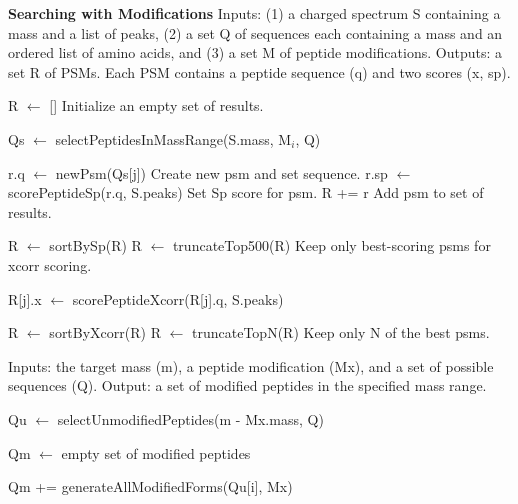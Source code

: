 \documentclass[12pt]{article}
\begin{document}
\begin{algorithm}
\caption{{\bf Searching with Modifications} Inputs: (1) a charged
  spectrum S containing a mass and a list of peaks, (2) a set Q of
  sequences each containing a mass and an ordered list of amino acids,
  and (3) a set M of peptide modifications. Outputs: a set R of PSMs.
  Each PSM contains a peptide sequence (q) and two scores (x, sp).} 

\begin{algorithmic}[1]

\State R $\gets$ []
\Comment Initialize an empty set of results.

   \State Qs $\gets$ selectPeptidesInMassRange(S.mass, M$_i$, Q)
   
     \State r.q $\gets$ newPsm(Qs[j])
     \Comment Create new psm and set sequence.
     \State r.sp $\gets$ scorePeptideSp(r.q, S.peaks)
     \Comment Set Sp score for psm.
     \State R += r
     \Comment Add psm to set of results.
   \EndFor

   \State R $\gets$ sortBySp(R)
   \State R $\gets$ truncateTop500(R)
   \Comment Keep only best-scoring psms for xcorr scoring.

     \State R[j].x $\gets$ scorePeptideXcorr(R[j].q, S.peaks)
   \EndFor

   \State R $\gets$ sortByXcorr(R)
   \State R $\gets$ truncateTopN(R)
   \Comment Keep only N of the best psms.

\EndFor

\State {}
\EndProcedure
\end{algorithmic}
\end{algorithm}

\begin{algorithm}
\caption{ Inputs: the target mass (m), a peptide modification (Mx),
  and a set of possible sequences (Q).  Output: a set of modified
  peptides in the specified mass range.}

\begin{algorithmic}[1]
  \State Qu $\gets$ selectUnmodifiedPeptides(m - Mx.mass, Q)
   
  \State Qm $\gets$ empty set of modified peptides

      \State Qm += generateAllModifiedForms(Qu[i], Mx)
    \EndIf
  \EndFor

  \State {}
\EndProcedure
\end{algorithmic}
\end{algorithm}
\end{document}
